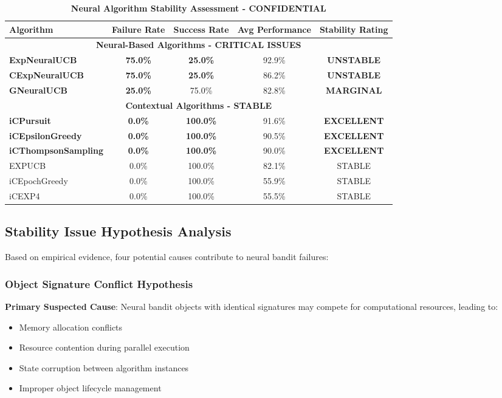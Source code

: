 \documentclass[12pt,a4paper]{article}
\newcommand{\critical}[1]{\textcolor{criticalcolor}{\textbf{#1}}}
\newcommand{\success}[1]{\textcolor{successcolor}{\textbf{#1}}}
\newcommand{\warning}[1]{\textcolor{warningcolor}{\textbf{#1}}}
\begin{document}
\begin{table}[H]
\centering
\caption{\critical{Neural Algorithm Stability Assessment - CONFIDENTIAL}}
\begin{tabular}{|l|c|c|c|c|}
\hline
\textbf{Algorithm} & \textbf{Failure Rate} & \textbf{Success Rate} & \textbf{Avg Performance} & \textbf{Stability Rating} \\
\hline
\hline
\multicolumn{5}{|c|}{\textbf{Neural-Based Algorithms - CRITICAL ISSUES}} \\
\hline
\critical{ExpNeuralUCB} & \critical{75.0\%} & \critical{25.0\%} & 92.9\% & \critical{UNSTABLE} \\
\critical{CExpNeuralUCB} & \critical{75.0\%} & \critical{25.0\%} & 86.2\% & \critical{UNSTABLE} \\
\warning{GNeuralUCB} & \warning{25.0\%} & 75.0\% & 82.8\% & \warning{MARGINAL} \\
\hline
\multicolumn{5}{|c|}{\textbf{Contextual Algorithms - STABLE}} \\
\hline
\success{iCPursuit} & \success{0.0\%} & \success{100.0\%} & 91.6\% & \success{EXCELLENT} \\
\success{iCEpsilonGreedy} & \success{0.0\%} & \success{100.0\%} & 90.5\% & \success{EXCELLENT} \\
\success{iCThompsonSampling} & \success{0.0\%} & \success{100.0\%} & 90.0\% & \success{EXCELLENT} \\
EXPUCB & 0.0\% & 100.0\% & 82.1\% & STABLE \\
iCEpochGreedy & 0.0\% & 100.0\% & 55.9\% & STABLE \\
iCEXP4 & 0.0\% & 100.0\% & 55.5\% & STABLE \\
\hline
\end{tabular}
\end{table}

\subsection{Stability Issue Hypothesis Analysis}

Based on empirical evidence, four potential causes contribute to neural bandit failures:

\subsubsection{Object Signature Conflict Hypothesis}
\critical{Primary Suspected Cause}: Neural bandit objects with identical signatures may compete for computational resources, leading to:
\begin{itemize}
\item Memory allocation conflicts
\item Resource contention during parallel execution
\item State corruption between algorithm instances
\item Improper object lifecycle management
\end{itemize}
\end{document}

